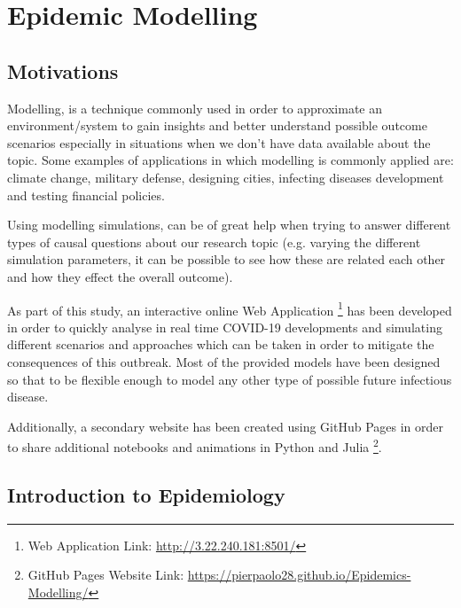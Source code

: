 \chapter{Epidemic Modelling}
\label{ch:progress}

\section{Motivations}
Modelling, is a technique commonly used in order to approximate an environment/system to gain insights and better understand possible outcome scenarios especially in situations when we don't have data available about the topic. Some examples of applications in which modelling is commonly applied are: climate change, military defense, designing cities, infecting diseases development and testing financial policies. 

Using modelling simulations, can be of great help when trying to answer different types of causal questions about our research topic (e.g. varying the different simulation parameters, it can be possible to see how these are related each other and how they effect the overall outcome). 

As part of this study, an interactive online Web Application \footnote{Web Application Link: \url{http://3.22.240.181:8501/}} has been developed in order to quickly analyse in real time COVID-19 developments and simulating different scenarios and approaches which can be taken in order to mitigate the consequences of this outbreak. Most of the provided models have been designed so that to be flexible enough to model any other type of possible future infectious disease. 

Additionally, a secondary website has been created using GitHub Pages in order to share additional notebooks and animations in Python and Julia \footnote{GitHub Pages Website Link: \url{https://pierpaolo28.github.io/Epidemics-Modelling/}}. 

\section{Introduction to Epidemiology}

